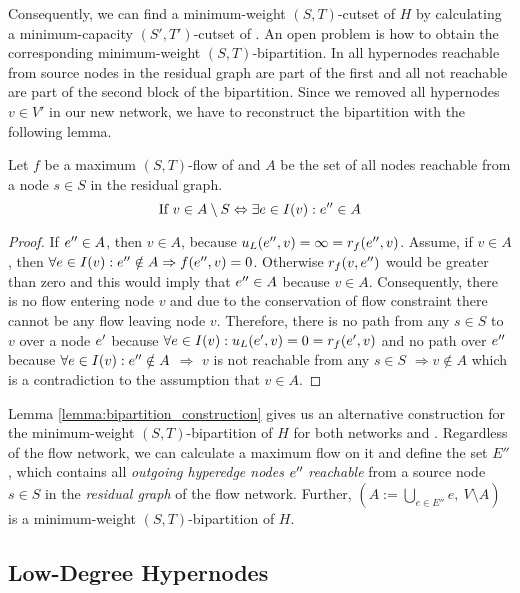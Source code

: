 Consequently, we can find a minimum-weight $(S,T)$-cutset of $H$ by calculating
a minimum-capacity $(S',T')$-cutset of . An open problem is how to obtain the 
corresponding minimum-weight $(S,T)$-bipartition. In  all hypernodes
reachable from source nodes in the residual graph are part of the first and 
all not reachable are part of the second block of the bipartition. Since we removed 
all hypernodes $v \in V'$ in our new network, we have to reconstruct the bipartition
with the following lemma.

\begin{lemma}
\label{lemma:bipartition_construction}
Let $f$ be a maximum $(S,T)$-flow  of  and $A$ be the set of all nodes reachable
from a node $s \in S$ in the residual graph.
\[ \text{If } v \in A \setminus S \Leftrightarrow \exists e \in I(v): e'' \in A \]
\end{lemma}

\begin{proof}
If $e'' \in A$, then $v \in A$, because $u_L(e'',v) = \infty = r_f(e'',v)$.
Assume, if $v \in A$, then $\forall e \in I(v): e'' \notin A \Rightarrow f(e'',v) = 0$. 
Otherwise $r_f(v, e'')$ would be greater than zero and this would imply that $e'' \in A$
because $v \in A$. Consequently, there is no flow entering node $v$ and due to the conservation
of flow constraint there cannot be any flow leaving node $v$. Therefore, there is no path
from any $s \in S$ to $v$ over a node $e'$ because $\forall e \in I(v): u_L(e',v) = 0 = r_f(e',v)$ and no path over $e''$ because $\forall e \in I(v): e'' \notin A$
$\Rightarrow$ $v$ is not reachable from any $s \in S$ $\Rightarrow v \notin A$ which is a contradiction
to the assumption that $v \in A$.
\end{proof}

Lemma \ref{lemma:bipartition_construction} gives us an alternative construction for the minimum-weight $(S,T)$-bipartition
of $H$ for both networks  and . Regardless of the flow network, we can 
calculate a maximum flow on it and define the set $E''$, which contains all \emph{outgoing hyperedge
nodes} $e''$ \emph{reachable} from a source node $s \in S$ in the \emph{residual graph} of the flow network. 
Further, $(A := \bigcup_{e \in E''} e,\ V\setminus A)$ is a 
minimum-weight $(S,T)$-bipartition of $H$.


\subsection{Low-Degree Hypernodes}
\label{sec:degree_network}

